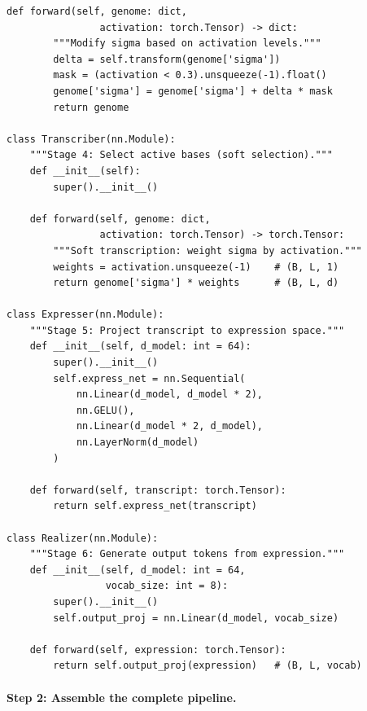\begin{lstlisting}[style=dogmapython, caption={Lab 6: DOGMA pipeline stages as PyTorch modules.}]
    def forward(self, genome: dict,
                activation: torch.Tensor) -> dict:
        """Modify sigma based on activation levels."""
        delta = self.transform(genome['sigma'])
        mask = (activation < 0.3).unsqueeze(-1).float()
        genome['sigma'] = genome['sigma'] + delta * mask
        return genome

class Transcriber(nn.Module):
    """Stage 4: Select active bases (soft selection)."""
    def __init__(self):
        super().__init__()

    def forward(self, genome: dict,
                activation: torch.Tensor) -> torch.Tensor:
        """Soft transcription: weight sigma by activation."""
        weights = activation.unsqueeze(-1)    # (B, L, 1)
        return genome['sigma'] * weights      # (B, L, d)

class Expresser(nn.Module):
    """Stage 5: Project transcript to expression space."""
    def __init__(self, d_model: int = 64):
        super().__init__()
        self.express_net = nn.Sequential(
            nn.Linear(d_model, d_model * 2),
            nn.GELU(),
            nn.Linear(d_model * 2, d_model),
            nn.LayerNorm(d_model)
        )

    def forward(self, transcript: torch.Tensor):
        return self.express_net(transcript)

class Realizer(nn.Module):
    """Stage 6: Generate output tokens from expression."""
    def __init__(self, d_model: int = 64,
                 vocab_size: int = 8):
        super().__init__()
        self.output_proj = nn.Linear(d_model, vocab_size)

    def forward(self, expression: torch.Tensor):
        return self.output_proj(expression)   # (B, L, vocab)
\end{lstlisting}

\paragraph{Step 2: Assemble the complete pipeline.}


